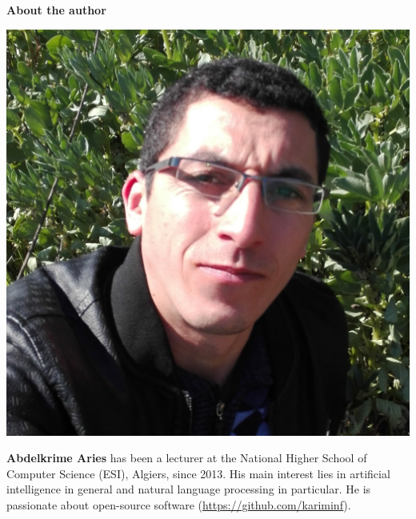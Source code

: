 \documentclass{KBook}
\begin{document}
\begin{tcolorbox}[colback=cyan,
	colframe=cyan,  
	arc=0pt,outer arc=0pt,
	valign=top, 
	halign=center,
	width=\textwidth]
	
	\color{white}
	\bfseries\LARGE About the author
	
\end{tcolorbox}\vspace{-.5cm}
\begin{tcolorbox}[colback=my-grey,
	colframe=my-grey,  
	center, arc=0pt,outer arc=0pt,
	valign=top, 
	halign=flush left,
	width=\textwidth]	
	
	\begin{minipage}[t]{0.15\textwidth}
		\includegraphics[width=\textwidth]{../img/misc/aak.jpg}
	\end{minipage}
	\begin{minipage}[t]{0.01\textwidth}
	\end{minipage}
	\begin{minipage}[t]{0.80\textwidth}
		\normalsize\vspace*{-0.2\textwidth}
		\textbf{Abdelkrime Aries} has been a lecturer at the National Higher School of Computer Science (ESI), Algiers, since 2013. 
		His main interest lies in artificial intelligence in general and natural language processing in particular. 
		He is passionate about open-source software (\url{https://github.com/kariminf}).
		

\end{minipage}
\end{tcolorbox}
\end{document}
